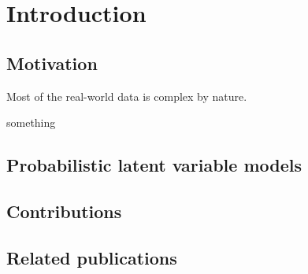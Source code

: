 
\chapter{Introduction}\label{chpt:intro}

\section{Motivation}\label{chpt:intro:sec:motivation}

Most of the real-world data is complex by nature. 


\PP something

\section{Probabilistic latent variable models}\label{chpt:intro:sec:model}

\section{Contributions}\label{chpt:intro:sec:contribution}

\section{Related publications}

